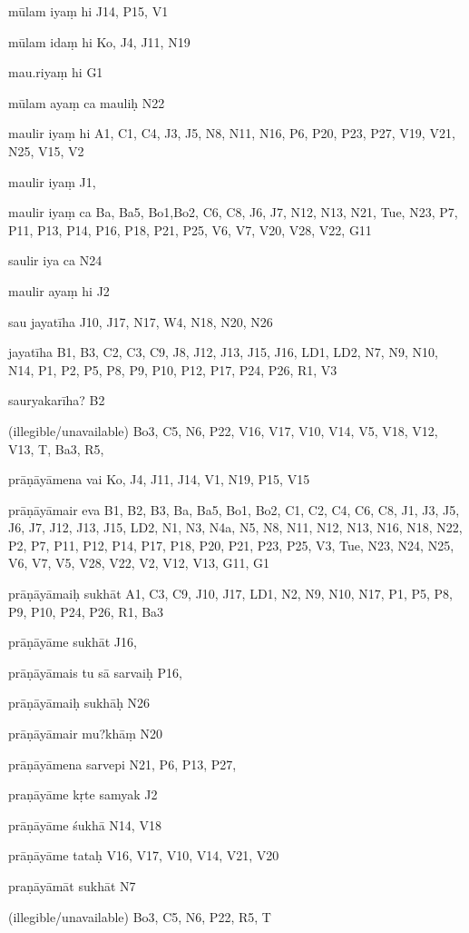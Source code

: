 \begin{marma}[hp02_009]
\begin{marma}[hp02_011]
 \begin{marma}[hp02_35d]
\item[mūlam iyaṃ hi] J14, P15, V1
\item[mūlam idaṃ hi] Ko, J4, J11, N19
\item[mau.riyaṃ hi] G1
\item[mūlam ayaṃ ca mauliḥ] N22
\item[maulir iyaṃ hi] A1, C1, C4, J3, J5, N8, N11, N16, P6, P20, P23, P27, V19, V21, N25, V15, V2
\item[maulir iyaṃ] J1,
\item[maulir iyaṃ ca] Ba, Ba5, Bo1,Bo2, C6, C8, J6, J7, N12, N13, N21, Tue, N23, P7, P11, P13, P14, P16, P18, P21, P25, V6, V7, V20, V28, V22, G11
\item[saulir iya ca] N24
\item[maulir ayaṃ hi] J2
\item[sau jayatīha] J10, J17, N17, W4, N18, N20, N26
\item[jayatīha] B1, B3, C2, C3, C9, J8, J12, J13, J15, J16, LD1, LD2, N7, N9, N10, N14, P1, P2, P5, P8, P9, P10, P12, P17, P24, P26, R1, V3
\item[sauryakarīha?] B2
\item[(illegible/unavailable)] Bo3, C5, N6, P22, V16, V17, V10, V14, V5, V18, V12, V13, T, Ba3, R5,
  \begin{description}

    \end{description}
 \end{marma}

 \begin{marma}[hp02_38a]
\item[prāṇāyāmena vai] Ko, J4, J11, J14, V1, N19, P15, V15
\item[prāṇāyāmair eva] B1, B2, B3, Ba, Ba5, Bo1, Bo2, C1, C2, C4, C6, C8, J1, J3, J5, J6, J7, J12, J13, J15, LD2, N1, N3, N4a, N5, N8, N11, N12, N13, N16, N18, N22, P2, P7, P11, P12, P14, P17, P18, P20, P21, P23, P25, V3, Tue, N23, N24, N25, V6, V7, V5, V28, V22, V2, V12, V13, G11, G1
\item[prāṇāyāmaiḥ sukhāt] A1, C3, C9, J10, J17, LD1, N2, N9, N10, N17, P1, P5, P8, P9, P10, P24, P26, R1, Ba3
\item[prāṇāyāme sukhāt] J16,
\item[prāṇāyāmais tu sā sarvaiḥ] P16,
\item[prāṇāyāmaiḥ sukhāḥ] N26
\item[prāṇāyāmair mu?khāṃ] N20
\item[prāṇāyāmena sarvepi] N21, P6, P13, P27, 
\item[praṇāyāme kṛte samyak] J2
\item[prāṇāyāme śukhā] N14, V18
\item[prāṇāyāme tataḥ] V16, V17, V10, V14, V21, V20
\item[praṇāyāmāt sukhāt] N7
\item[(illegible/unavailable)] Bo3, C5, N6, P22, R5, T
  \begin{description}


\end{description}
\end{marma}
\end{marma}
\end{marma}
